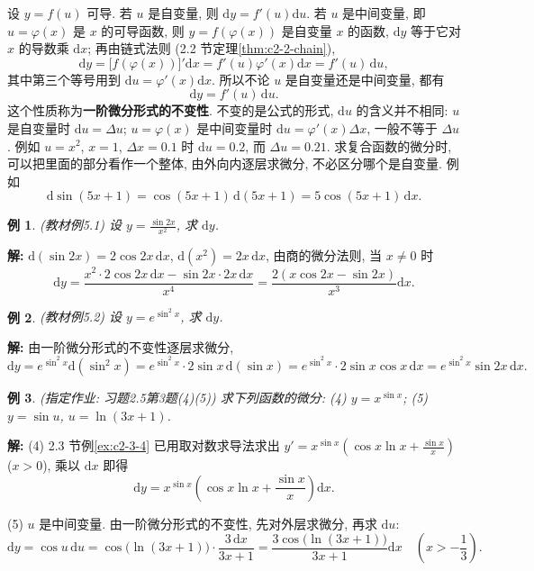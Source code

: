 \documentclass[UTF8,openany]{ctexbook}
\theoremstyle{chinesetextbook}
\newtheorem{example}{例}[section]
\newenvironment{cnsolution}{\par\indent\textbf{解:} \ignorespaces}{\par}
\newcommand{\dd}{\mathrm d}
\begin{document}
设 $y=f(u)$ 可导. 若 $u$ 是自变量, 则 $\dd y=f'(u)\dd u$. 若 $u$ 是中间变量, 即 $u=\varphi(x)$ 是 $x$ 的可导函数, 则 $y=f(\varphi(x))$ 是自变量 $x$ 的函数, $\dd y$ 等于它对 $x$ 的导数乘 $\dd x$; 再由链式法则 (2.2 节定理\ref{thm:c2-2-chain}),
\[
\dd y=\bigl[f(\varphi(x))\bigr]'\dd x=f'(u)\varphi'(x)\dd x=f'(u)\,\dd u,
\]
其中第三个等号用到 $\dd u=\varphi'(x)\dd x$. 所以不论 $u$ 是自变量还是中间变量, 都有
\[
\dd y=f'(u)\,\dd u.
\]
这个性质称为\textbf{一阶微分形式的不变性}. 不变的是公式的形式, $\dd u$ 的含义并不相同: $u$ 是自变量时 $\dd u=\Delta u$; $u=\varphi(x)$ 是中间变量时 $\dd u=\varphi'(x)\Delta x$, 一般不等于 $\Delta u$. 例如 $u=x^2$, $x=1$, $\Delta x=0.1$ 时 $\dd u=0.2$, 而 $\Delta u=0.21$. 求复合函数的微分时, 可以把里面的部分看作一个整体, 由外向内逐层求微分, 不必区分哪个是自变量. 例如
\[
\dd\sin(5x+1)=\cos(5x+1)\,\dd(5x+1)=5\cos(5x+1)\,\dd x.
\]
\begin{example}\label{ex:c2-5-1}
\textnormal{(教材例5.1)} 设 $\displaystyle y=\frac{\sin2x}{x^2}$, 求 $\dd y$.
\end{example}
\begin{cnsolution}
$\dd(\sin2x)=2\cos2x\,\dd x$, $\dd(x^2)=2x\,\dd x$, 由商的微分法则, 当 $x\ne0$ 时
\[
\dd y=\frac{x^2\cdot2\cos2x\,\dd x-\sin2x\cdot2x\,\dd x}{x^4}=\frac{2(x\cos2x-\sin2x)}{x^3}\dd x.
\]
\end{cnsolution}
\begin{example}\label{ex:c2-5-2}
\textnormal{(教材例5.2)} 设 $y=e^{\sin^2x}$, 求 $\dd y$.
\end{example}
\begin{cnsolution}
由一阶微分形式的不变性逐层求微分,
\[
\dd y=e^{\sin^2x}\dd(\sin^2x)=e^{\sin^2x}\cdot2\sin x\,\dd(\sin x)=e^{\sin^2x}\cdot2\sin x\cos x\,\dd x=e^{\sin^2x}\sin2x\,\dd x.
\]
\end{cnsolution}
\begin{example}\label{ex:c2-h5-3}
\textnormal{(指定作业: 习题2.5第3题(4)(5))} 求下列函数的微分: (4) $y=x^{\sin x}$; (5) $y=\sin u$, $u=\ln(3x+1)$.
\end{example}
\begin{cnsolution}
(4) 2.3 节例\ref{ex:c2-3-4} 已用取对数求导法求出 $\displaystyle y'=x^{\sin x}\left(\cos x\ln x+\frac{\sin x}x\right)$ ($x>0$), 乘以 $\dd x$ 即得
\[
\dd y=x^{\sin x}\left(\cos x\ln x+\frac{\sin x}x\right)\dd x.
\]

(5) $u$ 是中间变量. 由一阶微分形式的不变性, 先对外层求微分, 再求 $\dd u$:
\[
\dd y=\cos u\,\dd u=\cos\bigl(\ln(3x+1)\bigr)\cdot\frac{3\,\dd x}{3x+1}=\frac{3\cos\bigl(\ln(3x+1)\bigr)}{3x+1}\dd x\quad\left(x>-\frac13\right).
\]
\end{cnsolution}
\end{document}
